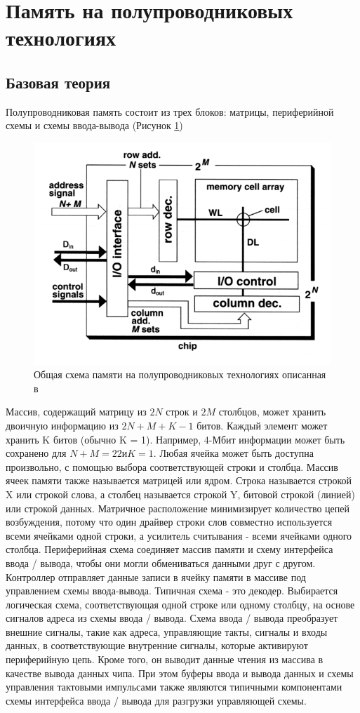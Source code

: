 \documentclass[a4paper,12pt]{article} %
\begin{document}
\section{Память на полупроводниковых технологиях}
\subsection{Базовая теория}
Полупроводниковая память состоит из трех блоков: матрицы, периферийной схемы и схемы ввода-вывода (Рисунок \ref{pic:ram_array})
   \begin{figure}[H]
  \includegraphics[width=\textwidth]{RAM.png}
  \caption{Общая схема памяти на полупроводниковых технологиях описанная в \cite{DRAM-II}}
  \label{pic:ram_array}
  \end{figure}

Массив, содержащий матрицу из $2N$ строк и $2M$ столбцов, может хранить двоичную информацию из $2N + M + K-1$ битов. Каждый элемент может хранить K битов (обычно K = 1). Например, 4-Мбит информации может быть сохранено для $N + M = 22 и K = 1$. Любая ячейка может быть доступна произвольно, с помощью выбора  соответствующей строки и столбца. Массив ячеек памяти также называется матрицей или ядром. Строка называется строкой X или строкой слова, а столбец называется строкой Y, битовой строкой (линией) или строкой данных. Матричное расположение минимизирует количество цепей возбуждения, потому что один драйвер строки слов совместно используется всеми ячейками одной строки, а усилитель считывания - всеми ячейками одного столбца. Периферийная схема соединяет массив памяти и схему интерфейса ввода / вывода, чтобы они могли обмениваться данными друг с другом. Контроллер отправляет данные записи в ячейку памяти в массиве под управлением схемы ввода-вывода. Типичная схема - это декодер. Выбирается логическая схема, соответствующая одной строке или одному столбцу, на основе сигналов адреса из схемы ввода / вывода. Схема ввода / вывода преобразует внешние сигналы, такие как адреса, управляющие такты, сигналы и входы данных, в соответствующие внутренние сигналы, которые активируют периферийную цепь. Кроме того, он выводит данные чтения из массива в качестве вывода данных чипа. При этом буферы ввода и вывода данных и схемы управления тактовыми импульсами также являются типичными компонентами схемы интерфейса ввода / вывода для разгрузки управляющей схемы.
\end{document}
